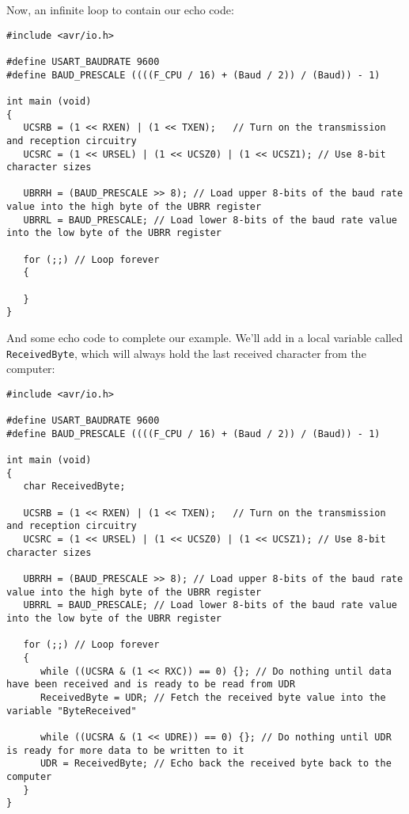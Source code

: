 \documentclass[a4paper,oneside,notitlepage]{book}
\begin{document}
Now, an infinite loop to contain our echo code:

\begin{center}
\begin{lstlisting}
#include <avr/io.h>

#define USART_BAUDRATE 9600
#define BAUD_PRESCALE ((((F_CPU / 16) + (Baud / 2)) / (Baud)) - 1)

int main (void)
{
   UCSRB = (1 << RXEN) | (1 << TXEN);   // Turn on the transmission and reception circuitry
   UCSRC = (1 << URSEL) | (1 << UCSZ0) | (1 << UCSZ1); // Use 8-bit character sizes

   UBRRH = (BAUD_PRESCALE >> 8); // Load upper 8-bits of the baud rate value into the high byte of the UBRR register
   UBRRL = BAUD_PRESCALE; // Load lower 8-bits of the baud rate value into the low byte of the UBRR register

   for (;;) // Loop forever
   {

   }
}
\end{lstlisting}
\end{center}

And some echo code to complete our example. We'll add in a local variable called \texttt{ReceivedByte}, which will always hold the last received character from the computer:

\begin{center}
\begin{lstlisting}
#include <avr/io.h>

#define USART_BAUDRATE 9600
#define BAUD_PRESCALE ((((F_CPU / 16) + (Baud / 2)) / (Baud)) - 1)

int main (void)
{
   char ReceivedByte;

   UCSRB = (1 << RXEN) | (1 << TXEN);   // Turn on the transmission and reception circuitry
   UCSRC = (1 << URSEL) | (1 << UCSZ0) | (1 << UCSZ1); // Use 8-bit character sizes

   UBRRH = (BAUD_PRESCALE >> 8); // Load upper 8-bits of the baud rate value into the high byte of the UBRR register
   UBRRL = BAUD_PRESCALE; // Load lower 8-bits of the baud rate value into the low byte of the UBRR register

   for (;;) // Loop forever
   {
      while ((UCSRA & (1 << RXC)) == 0) {}; // Do nothing until data have been received and is ready to be read from UDR
      ReceivedByte = UDR; // Fetch the received byte value into the variable "ByteReceived"

      while ((UCSRA & (1 << UDRE)) == 0) {}; // Do nothing until UDR is ready for more data to be written to it
      UDR = ReceivedByte; // Echo back the received byte back to the computer
   }
}
\end{lstlisting}
\end{center}
\end{document}
